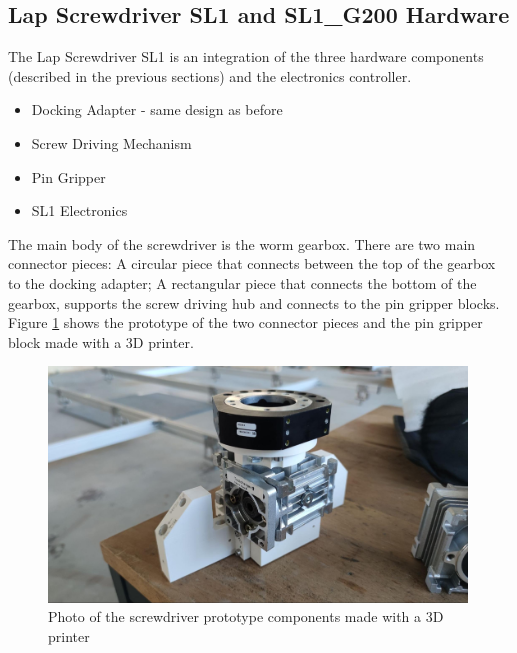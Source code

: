 \subsection{Lap Screwdriver SL1 and SL1\_G200 Hardware}
\label{subsection:exploration-4-lap-screwdriver-sl1-and-sl1-g200-hardware}

The Lap Screwdriver SL1 is an integration of the three hardware components (described in the previous sections) and the electronics controller.

\begin{itemize}
    \item Docking Adapter - same design as before 
    \item Screw Driving Mechanism 
    \item Pin Gripper 
    \item SL1 Electronics 
\end{itemize}

The main body of the screwdriver is the worm gearbox. There are two main connector pieces: A circular piece that connects between the top of the gearbox to the docking adapter; A rectangular piece that connects the bottom of the gearbox, supports the screw driving hub and connects to the pin gripper blocks. Figure \ref{fig:screwdriver-prototype-components} shows the prototype of the two connector pieces and the pin gripper block made with a 3D printer.

\begin{figure}[!h]
    \centering
    \includegraphics[width=0.99\textwidth]{images/7a/img49.jpg}
    \caption{Photo of the screwdriver prototype components made with a 3D printer}
    \label{fig:screwdriver-prototype-components}
\end{figure}

